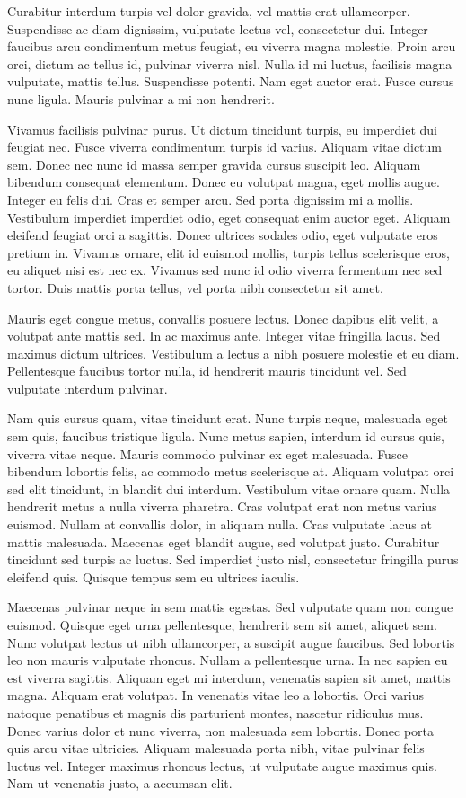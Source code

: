 \documentclass[
]{book}
\begin{document}
Curabitur interdum turpis vel dolor gravida, vel mattis erat ullamcorper. Suspendisse ac diam dignissim, vulputate lectus vel, consectetur dui. Integer faucibus arcu condimentum metus feugiat, eu viverra magna molestie. Proin arcu orci, dictum ac tellus id, pulvinar viverra nisl. Nulla id mi luctus, facilisis magna vulputate, mattis tellus. Suspendisse potenti. Nam eget auctor erat. Fusce cursus nunc ligula. Mauris pulvinar a mi non hendrerit.

Vivamus facilisis pulvinar purus. Ut dictum tincidunt turpis, eu imperdiet dui feugiat nec. Fusce viverra condimentum turpis id varius. Aliquam vitae dictum sem. Donec nec nunc id massa semper gravida cursus suscipit leo. Aliquam bibendum consequat elementum. Donec eu volutpat magna, eget mollis augue. Integer eu felis dui. Cras et semper arcu. Sed porta dignissim mi a mollis. Vestibulum imperdiet imperdiet odio, eget consequat enim auctor eget. Aliquam eleifend feugiat orci a sagittis. Donec ultrices sodales odio, eget vulputate eros pretium in. Vivamus ornare, elit id euismod mollis, turpis tellus scelerisque eros, eu aliquet nisi est nec ex. Vivamus sed nunc id odio viverra fermentum nec sed tortor. Duis mattis porta tellus, vel porta nibh consectetur sit amet.

Mauris eget congue metus, convallis posuere lectus. Donec dapibus elit velit, a volutpat ante mattis sed. In ac maximus ante. Integer vitae fringilla lacus. Sed maximus dictum ultrices. Vestibulum a lectus a nibh posuere molestie et eu diam. Pellentesque faucibus tortor nulla, id hendrerit mauris tincidunt vel. Sed vulputate interdum pulvinar.

Nam quis cursus quam, vitae tincidunt erat. Nunc turpis neque, malesuada eget sem quis, faucibus tristique ligula. Nunc metus sapien, interdum id cursus quis, viverra vitae neque. Mauris commodo pulvinar ex eget malesuada. Fusce bibendum lobortis felis, ac commodo metus scelerisque at. Aliquam volutpat orci sed elit tincidunt, in blandit dui interdum. Vestibulum vitae ornare quam. Nulla hendrerit metus a nulla viverra pharetra. Cras volutpat erat non metus varius euismod. Nullam at convallis dolor, in aliquam nulla. Cras vulputate lacus at mattis malesuada. Maecenas eget blandit augue, sed volutpat justo. Curabitur tincidunt sed turpis ac luctus. Sed imperdiet justo nisl, consectetur fringilla purus eleifend quis. Quisque tempus sem eu ultrices iaculis.

Maecenas pulvinar neque in sem mattis egestas. Sed vulputate quam non congue euismod. Quisque eget urna pellentesque, hendrerit sem sit amet, aliquet sem. Nunc volutpat lectus ut nibh ullamcorper, a suscipit augue faucibus. Sed lobortis leo non mauris vulputate rhoncus. Nullam a pellentesque urna. In nec sapien eu est viverra sagittis. Aliquam eget mi interdum, venenatis sapien sit amet, mattis magna. Aliquam erat volutpat. In venenatis vitae leo a lobortis. Orci varius natoque penatibus et magnis dis parturient montes, nascetur ridiculus mus. Donec varius dolor et nunc viverra, non malesuada sem lobortis. Donec porta quis arcu vitae ultricies. Aliquam malesuada porta nibh, vitae pulvinar felis luctus vel. Integer maximus rhoncus lectus, ut vulputate augue maximus quis. Nam ut venenatis justo, a accumsan elit.
\end{document}

